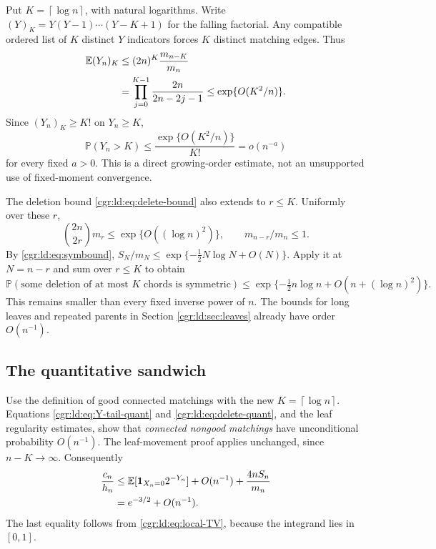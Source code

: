 \documentclass[11pt,letterpaper]{article}
\numberwithin{equation}{section}
\theoremstyle{definition}\newtheorem{definition}[theorem]{Definition}
\theoremstyle{remark}\newtheorem{remark}[theorem]{Remark}
\newcommand{\PP}{\mathbb P}
\newcommand{\EE}{\mathbb E}
\newcommand{\one}{\mathbf1}
\newcommand{\ceil}[1]{\left\lceil #1\right\rceil}
\begin{document}
Put $K=\ceil{\log n}$, with natural logarithms. Write
$(Y)_K=Y(Y-1)\cdots(Y-K+1)$ for the falling factorial.
Any compatible ordered list of $K$ distinct $Y$ indicators
forces $K$ distinct matching edges. Thus
\begin{align}
 \EE(Y_n)_K
 &\le(2n)^K\frac{m_{n-K}}{m_n}\notag\\
 &=\prod_{j=0}^{K-1}\frac{2n}{2n-2j-1}
 \le\exp\{O(K^2/n)\}.\label{cgr:ld:eq:Y-factorial}
\end{align}
Since $(Y_n)_K\ge K!$ on $Y_n\ge K$,
\begin{equation}\label{cgr:ld:eq:Y-tail-quant}
 \PP(Y_n>K)\le\frac{\exp\{O(K^2/n)\}}{K!}
   =o(n^{-a})
\end{equation}
for every fixed $a>0$. This is a direct growing-order estimate,
not an unsupported use of fixed-moment convergence.

The deletion bound \eqref{cgr:ld:eq:delete-bound} also extends to
$r\le K$. Uniformly over these $r$,
\[
 \binom{2n}{2r}m_r\le\exp\{O((\log n)^2)\},
 \qquad m_{n-r}/m_n\le1.
\]
By \eqref{cgr:ld:eq:symbound},
$S_N/m_N\le\exp\{-\tfrac12N\log N+O(N)\}$.
Apply it at $N=n-r$ and sum over $r\le K$ to obtain
\begin{equation}\label{cgr:ld:eq:delete-quant}
 \PP(\text{some deletion of at most }K\text{ chords is symmetric})
 \le\exp\{-\tfrac12n\log n+O(n+(\log n)^2)\}.
\end{equation}
This remains smaller than every fixed inverse power of $n$.
The bounds for long leaves and repeated parents in
Section \ref{cgr:ld:sec:leaves} already have order $O(n^{-1})$.

\subsection*{The quantitative sandwich}
Use the definition of good connected matchings with the new
$K=\ceil{\log n}$. Equations \eqref{cgr:ld:eq:Y-tail-quant} and
\eqref{cgr:ld:eq:delete-quant}, and the leaf regularity estimates, show
that \emph{connected nongood matchings} have unconditional
probability $O(n^{-1})$. The leaf-movement proof applies
unchanged, since $n-K\to\infty$. Consequently
\begin{align}
 \frac{c_n}{h_n}
 &\le\EE[\one_{X_n=0}2^{-Y_n}]+O(n^{-1})
           +\frac{4nS_n}{m_n}\notag\\
 &=e^{-3/2}+O(n^{-1}).\label{cgr:ld:eq:quant-upper}
\end{align}
The last equality follows from \eqref{cgr:ld:eq:local-TV}, because
the integrand lies in $[0,1]$.
\end{document}
